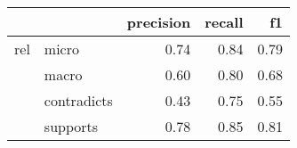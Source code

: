 \begin{tabular}{llrrr}
\toprule
    &          &  precision &  recall &   f1 \\
\midrule
rel & micro &       0.74 &    0.84 & 0.79 \\
    & macro &       0.60 &    0.80 & 0.68 \\
    & contradicts &       0.43 &    0.75 & 0.55 \\
    & supports &       0.78 &    0.85 & 0.81 \\
\bottomrule
\end{tabular}
